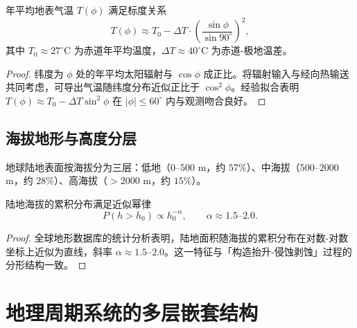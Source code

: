 \begin{proposition}[气候带的气温标度]\label{prop:climate_temperature_scaling}
年平均地表气温 $T(\phi)$ 满足标度关系
\[
T(\phi)\approx T_0-\Delta T\cdot\left(\frac{\sin\phi}{\sin 90^\circ}\right)^2,
\]
其中 $T_0\approx 27^\circ$C 为赤道年平均温度，$\Delta T\approx 40^\circ$C 为赤道-极地温差。
\end{proposition}

\begin{proof}
纬度为 $\phi$ 处的年平均太阳辐射与 $\cos\phi$ 成正比。将辐射输入与经向热输送共同考虑，可导出气温随纬度分布近似正比于 $\cos^2\phi$。经验拟合表明 $T(\phi)\approx T_0-\Delta T\sin^2\phi$ 在 $|\phi|\le 60^\circ$ 内与观测吻合良好。
\end{proof}

\subsection{海拔地形与高度分层}

\begin{definition}[地形高度分层]\label{def:terrain_elevation}
地球陆地表面按海拔分为三层：低地（$0$--$500$ m，约 $57\%$）、中海拔（$500$--$2000$ m，约 $28\%$）、高海拔（$>2000$ m，约 $15\%$）。
\end{definition}

\begin{proposition}[陆地海拔分布的幂律特征]\label{prop:hypsometric_curve}
陆地海拔的累积分布满足近似幂律
\[
P(h>h_0)\propto h_0^{-\alpha},\qquad \alpha\approx 1.5\text{--}2.0.
\]
\end{proposition}

\begin{proof}
全球地形数据库的统计分析表明，陆地面积随海拔的累积分布在对数-对数坐标上近似为直线，斜率 $\alpha\approx 1.5$--$2.0$。这一特征与「构造抬升-侵蚀剥蚀」过程的分形结构一致。
\end{proof}

\section{地理周期系统的多层嵌套结构}
\label{sec:geo_nested}

